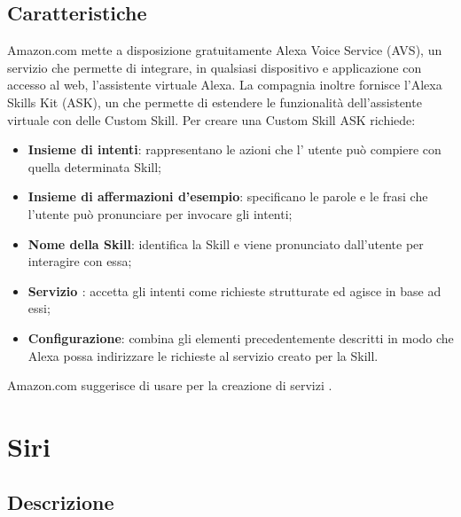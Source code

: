\documentclass[a4paper,titlepage]{article}
\begin{document}
	\subsection{Caratteristiche}
		Amazon.com mette a disposizione gratuitamente Alexa Voice Service (AVS), un servizio che permette di integrare, in qualsiasi dispositivo e applicazione con accesso al web, l'assistente virtuale Alexa. La compagnia inoltre fornisce l'Alexa Skills Kit (ASK), un  che permette di estendere le funzionalità dell'assistente virtuale con delle Custom Skill. Per creare una Custom Skill ASK richiede:
		\begin{itemize}
			\item \textbf{Insieme di intenti}: rappresentano le azioni che l' utente può compiere con quella determinata Skill; 
			\item \textbf{Insieme di affermazioni d'esempio}: specificano le parole e le frasi che l'utente può pronunciare per invocare gli intenti;
			\item \textbf{Nome della Skill}: identifica la Skill e viene pronunciato dall'utente per interagire con essa;
			\item \textbf{Servizio \textit{}}: accetta gli intenti come richieste strutturate ed agisce in base ad essi;
			\item \textbf{Configurazione}: combina gli elementi precedentemente descritti in modo che Alexa possa indirizzare le richieste al servizio creato per la Skill.
			
		\end{itemize}
	Amazon.com suggerisce di usare  per la creazione di servizi \textit{}.
		
	
\newpage	
	\section{Siri}
	\subsection{Descrizione}
	
\end{document}
